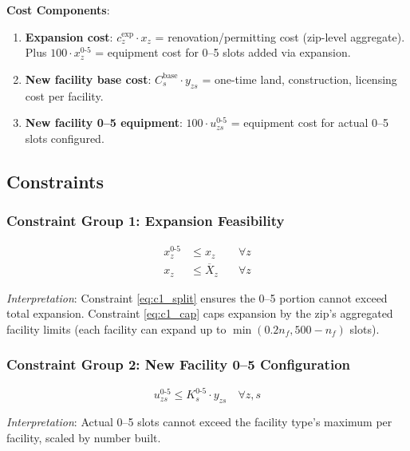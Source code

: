 \documentclass[12pt]{article}
\begin{document}
\textbf{Cost Components}:

\begin{enumerate}
    \item \textbf{Expansion cost}: $c_z^{\text{exp}} \cdot x_z$ = renovation/permitting cost (zip-level aggregate).
    \\ Plus $100 \cdot x_z^{0\text{-}5}$ = equipment cost for 0--5 slots added via expansion.
    
    \item \textbf{New facility base cost}: $C_s^{\text{base}} \cdot y_{zs}$ = one-time land, construction, licensing cost per facility.
    
    \item \textbf{New facility 0--5 equipment}: $100 \cdot u_{zs}^{0\text{-}5}$ = equipment cost for actual 0--5 slots configured.
\end{enumerate}

\subsection{Constraints}

\subsubsection{Constraint Group 1: Expansion Feasibility}

\begin{align}
x_z^{0\text{-}5} &\leq x_z & \quad \forall z \label{eq:c1_split} \\
x_z &\leq \overline{X}_z & \quad \forall z \label{eq:c1_cap}
\end{align}

\textit{Interpretation}: Constraint \eqref{eq:c1_split} ensures the 0--5 portion cannot exceed total expansion. 
Constraint \eqref{eq:c1_cap} caps expansion by the zip's aggregated facility limits 
(each facility can expand up to $\min(0.2 n_f, 500 - n_f)$ slots).

\subsubsection{Constraint Group 2: New Facility 0--5 Configuration}

\begin{equation}
u_{zs}^{0\text{-}5} \leq K_s^{0\text{-}5} \cdot y_{zs} \quad \forall z, s \label{eq:c2_config}
\end{equation}

\textit{Interpretation}: Actual 0--5 slots cannot exceed the facility type's maximum per facility, scaled by number built.
\end{document}
